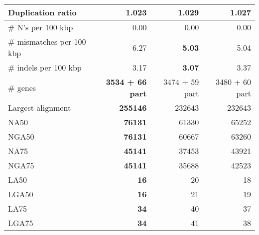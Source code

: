 \documentclass[12pt,a4paper]{article}
\begin{document}
\begin{table}[ht]
\begin{center}
\begin{tabular}{|l*{3}{|r}|}
Duplication ratio & {\bf 1.023} & 1.029 & 1.027 \\ \hline
\# N's per 100 kbp & 0.00 & 0.00 & 0.00 \\ \hline
\# mismatches per 100 kbp & 6.27 & {\bf 5.03} & 5.04 \\ \hline
\# indels per 100 kbp & 3.17 & {\bf 3.07} & 3.37 \\ \hline
\# genes & {\bf 3534 + 66 part} & 3474 + 59 part & 3480 + 60 part \\ \hline
Largest alignment & {\bf 255146} & 232643 & 232643 \\ \hline
NA50 & {\bf 76131} & 61330 & 65252 \\ \hline
NGA50 & {\bf 76131} & 60667 & 63260 \\ \hline
NA75 & {\bf 45141} & 37453 & 43921 \\ \hline
NGA75 & {\bf 45141} & 35688 & 42523 \\ \hline
LA50 & {\bf 16} & 20 & 18 \\ \hline
LGA50 & {\bf 16} & 21 & 19 \\ \hline
LA75 & {\bf 34} & 40 & 37 \\ \hline
LGA75 & {\bf 34} & 41 & 38 \\ \hline
\end{tabular}
\end{center}
\end{table}
\end{document}
